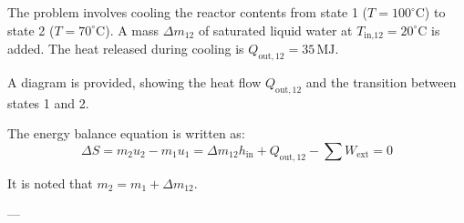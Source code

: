 The problem involves cooling the reactor contents from state 1 (\( T = 100^\circ\text{C} \)) to state 2 (\( T = 70^\circ\text{C} \)). A mass \( \Delta m_{12} \) of saturated liquid water at \( T_{\text{in,12}} = 20^\circ\text{C} \) is added. The heat released during cooling is \( Q_{\text{out},12} = 35 \, \text{MJ} \).  

A diagram is provided, showing the heat flow \( Q_{\text{out},12} \) and the transition between states 1 and 2.  

The energy balance equation is written as:  
\[
\Delta S = m_2 u_2 - m_1 u_1 = \Delta m_{12} h_{\text{in}} + Q_{\text{out},12} - \sum W_{\text{ext}} = 0
\]

It is noted that \( m_2 = m_1 + \Delta m_{12} \).  

---